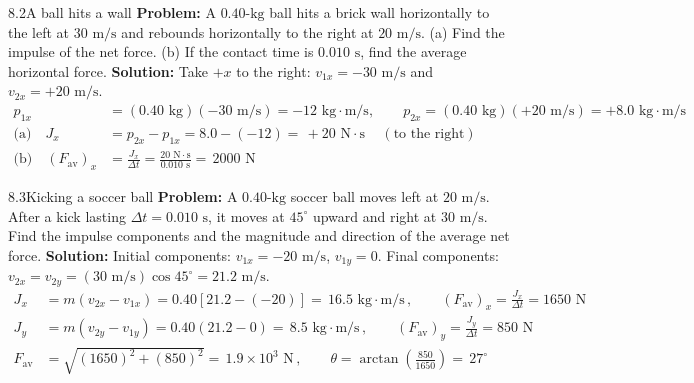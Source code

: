 \documentclass[11pt,a4paper,openany,oneside]{book}
\newcommand{\eqbox}[1]{\boxed{\,#1\,}}
\numberwithin{equation}{chapter}
\newcommand{\bk}[1]{\texorpdfstring{\enspace{\normalfont\small\color{slate}[Book #1]}}{ [Book #1]}}
\begin{document}
\begin{example}{8.2}{A ball hits a wall\bk{p.\ 245}}
\textbf{Problem:} A $0.40\text{-kg}$ ball hits a brick wall horizontally to the left at $30\text{ m/s}$ and rebounds horizontally to the right at $20\text{ m/s}$. (a) Find the impulse of the net force. (b) If the contact time is $0.010\text{ s}$, find the average horizontal force.
\tcblower
\textbf{Solution:} Take $+x$ to the right: $v_{1x} = -30\text{ m/s}$ and $v_{2x} = +20\text{ m/s}$.
\begin{align*}
  p_{1x} &= (0.40\text{ kg})(-30\text{ m/s}) = -12\text{ kg}\cdot\text{m/s}, \qquad p_{2x} = (0.40\text{ kg})(+20\text{ m/s}) = +8.0\text{ kg}\cdot\text{m/s}\\
  \text{(a)}\quad J_x &= p_{2x} - p_{1x} = 8.0 - (-12) = \eqbox{+20\text{ N}\cdot\text{s}} \quad(\text{to the right})\\
  \text{(b)}\quad (F_{\text{av}})_x &= \frac{J_x}{\Delta t} = \frac{20\text{ N}\cdot\text{s}}{0.010\text{ s}} = \eqbox{2000\text{ N}}
\end{align*}
\end{example}

\begin{example}{8.3}{Kicking a soccer ball\bk{p.\ 246}}
\textbf{Problem:} A $0.40\text{-kg}$ soccer ball moves left at $20\text{ m/s}$. After a kick lasting $\Delta t = 0.010\text{ s}$, it moves at $45^\circ$ upward and right at $30\text{ m/s}$. Find the impulse components and the magnitude and direction of the average net force.
\tcblower
\textbf{Solution:} Initial components: $v_{1x} = -20\text{ m/s}$, $v_{1y} = 0$. Final components: $v_{2x} = v_{2y} = (30\text{ m/s})\cos 45^\circ = 21.2\text{ m/s}$.
\begin{align*}
  J_x &= m(v_{2x}-v_{1x}) = 0.40[21.2 - (-20)] = \eqbox{16.5\text{ kg}\cdot\text{m/s}}, \qquad (F_{\text{av}})_x = \frac{J_x}{\Delta t} = 1650\text{ N}\\
  J_y &= m(v_{2y}-v_{1y}) = 0.40(21.2 - 0) = \eqbox{8.5\text{ kg}\cdot\text{m/s}}, \qquad (F_{\text{av}})_y = \frac{J_y}{\Delta t} = 850\text{ N}\\
  F_{\text{av}} &= \sqrt{(1650)^2 + (850)^2} = \eqbox{1.9\times 10^3\text{ N}}, \qquad \theta = \arctan\!\left(\frac{850}{1650}\right) = \eqbox{27^\circ}
\end{align*}
\end{example}
\end{document}
